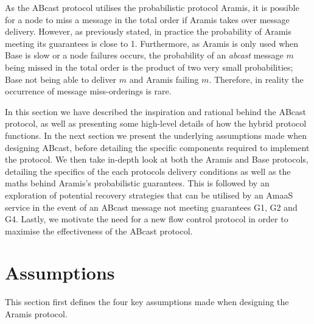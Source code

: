 As the \textsf{ABcast} protocol utilises the probabilistic protocol \textsf{Aramis}, it is possible for a node to miss a message in the total order if \textsf{Aramis} takes over message delivery.  However, as previously stated, in practice the probability of \textsf{Aramis} meeting its guarantees is close to 1.  Furthermore, as \textsf{Aramis} is only used when \textsf{Base} is slow or a node failures occurs, the probability of an \emph{abcast} message $m$ being missed in the total order is the product of two very small probabilities; \textsf{Base} not being able to deliver $m$ and \textsf{Aramis} failing $m$.  Therefore, in reality the occurrence of message miss-orderings is rare.  

In this section we have described the inspiration and rational behind the \textsf{ABcast} protocol, as well as presenting some high-level details of how the hybrid protocol functions.  In the next section we present the underlying assumptions made when designing \textsf{ABcast}, before detailing the specific components required to implement the protocol.  We then take in-depth look at both the \textsf{Aramis} and \textsf{Base} protocols, detailing the specifics of the each protocols delivery conditions as well as the maths behind \textsf{Aramis}'s probabilistic guarantees.  This is followed by an exploration of potential recovery strategies that can be utilised by an \textsf{AmaaS} service in the event of an \textsf{ABcast} message not meeting guarantees G1, G2 and G4.  Lastly, we motivate the need for a new flow control protocol in order to maximise the effectiveness of the \textsf{ABcast} protocol.  

\newpage
\section{Assumptions}
    This section first defines the four key assumptions made when designing the \textsf{Aramis} protocol. 

